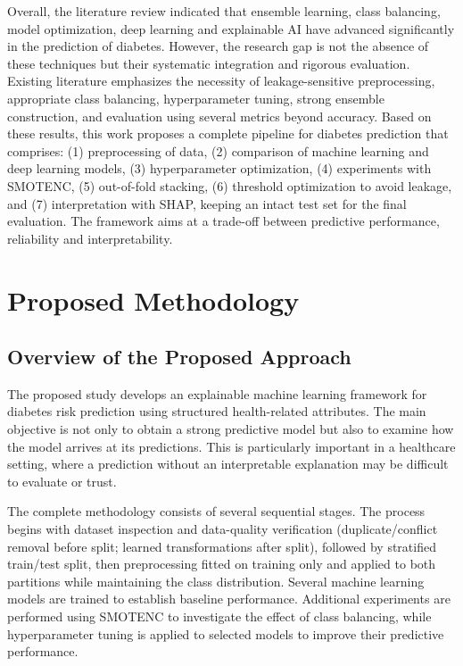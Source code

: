 \documentclass[conference]{IEEEtran}
\begin{document}
Overall, the literature review indicated that ensemble learning, class balancing, model optimization, deep learning and explainable AI have advanced significantly in the prediction of diabetes. However, the research gap is not the absence of these techniques but their systematic integration and rigorous evaluation. Existing literature emphasizes the necessity of leakage-sensitive preprocessing, appropriate class balancing, hyperparameter tuning, strong ensemble construction, and evaluation using several metrics beyond accuracy. Based on these results, this work proposes a complete pipeline for diabetes prediction that comprises: (1) preprocessing of data, (2) comparison of machine learning and deep learning models, (3) hyperparameter optimization, (4) experiments with SMOTENC, (5) out-of-fold stacking, (6) threshold optimization to avoid leakage, and (7) interpretation with SHAP, keeping an intact test set for the final evaluation. The framework aims at a trade-off between predictive performance, reliability and interpretability.

\section{Proposed Methodology}


\subsection{Overview of the Proposed Approach}

The proposed study develops an explainable machine learning framework for diabetes risk prediction using structured health-related attributes. The main objective is not only to obtain a strong predictive model but also to examine how the model arrives at its predictions. This is particularly important in a healthcare setting, where a prediction without an interpretable explanation may be difficult to evaluate or trust.

The complete methodology consists of several sequential stages. The process begins with dataset inspection and data-quality verification (duplicate/conflict removal before split; learned transformations after split), followed by stratified train/test split, then preprocessing fitted on training only and applied to both partitions while maintaining the class distribution. Several machine learning models are trained to establish baseline performance. Additional experiments are performed using SMOTENC to investigate the effect of class balancing, while hyperparameter tuning is applied to selected models to improve their predictive performance.
\end{document}
